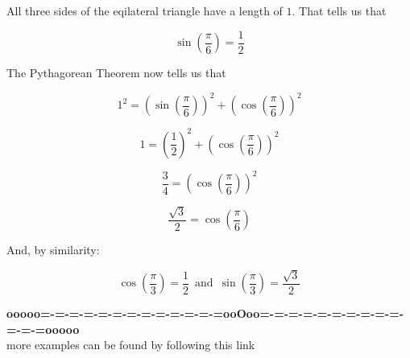 \documentclass{ximera}
\begin{document}
All three sides of the eqilateral triangle have a length of $1$.  That tells us that 

\[  \sin\left( \frac{\pi}{6} \right) = \frac{1}{2} \]


The Pythagorean Theorem now tells us that 

\[  1^2 = \left( \sin\left( \frac{\pi}{6} \right) \right)^2 + \left( \cos\left( \frac{\pi}{6} \right) \right)^2  \]


\[  1 = \left( \frac{1}{2} \right)^2 + \left( \cos\left( \frac{\pi}{6} \right) \right)^2  \]


\[  \frac{3}{4} = \left( \cos\left( \frac{\pi}{6} \right) \right)^2  \]



\[  \frac{\sqrt{3}}{2} = \cos\left( \frac{\pi}{6} \right)   \]



And, by similarity:


\[  \cos\left( \frac{\pi}{3} \right) = \frac{1}{2}   \, \text{ and } \,   \sin\left( \frac{\pi}{3} \right)  = \frac{\sqrt{3}}{2} \]  












\begin{center}
\textbf{\textcolor{green!50!black}{ooooo=-=-=-=-=-=-=-=-=-=-=-=-=ooOoo=-=-=-=-=-=-=-=-=-=-=-=-=ooooo}} \\

more examples can be found by following this link\\ 

\end{center}
\end{document}
